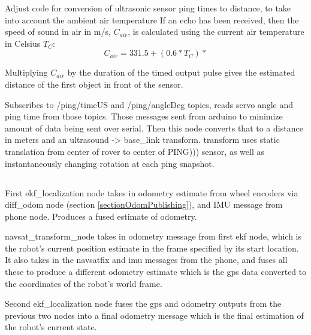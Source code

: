 Adjust code for conversion of ultrasonic sensor ping times to distance, to take into account the ambient air temperature
If an echo has been received, then the speed of sound in air in m/s, \(C_{air}\), is calculated using the current air temperature in Celsius \(T_C\):
\[C_{air} = 331.5 + (0.6 * T_C)*\]

Multiplying \(C_{air}\) by the duration of the timed output pulse gives the estimated distance of the first object in front of the sensor.

Subscribes to /ping/timeUS and /ping/angleDeg topics, reads servo angle and ping time from those topics. Those messages sent from arduino to minimize amount of data being sent over serial. Then this node converts that to a distance in meters and an ultrasound -> base\_link transform. transform uses static translation from center of rover to center of PING))) sensor, as well as instantaneously changing rotation at each ping snapshot.

\subsection{}
First ekf\_localization node takes in odometry estimate from wheel encoders via diff\_odom node (section \ref{sectionOdomPublishing}), and IMU message from phone node. Produces a fused estimate of odometry.

navsat\_transform\_node takes in odometry message from first ekf node, which is the robot’s current position estimate in the frame specified by its start location. It also takes in the navsatfix and imu messages from the phone, and fuses all these to produce a different odometry estimate which is the gps data converted to the coordinates of the robot's world frame.

Second ekf\_localization node fuses the gps and odometry outputs from the previous two nodes into a final odometry message which is the final estimation of the robot's current state.


\cite{robot_localization_paper}